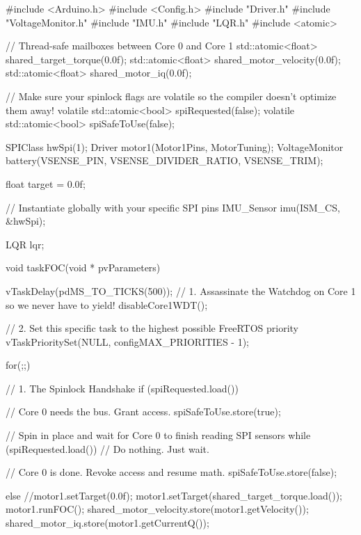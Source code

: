#include <Arduino.h>
#include <Config.h>
#include "Driver.h"
#include "VoltageMonitor.h"
#include "IMU.h"
#include "LQR.h"
#include <atomic>

// Thread-safe mailboxes between Core 0 and Core 1
std::atomic<float> shared_target_torque(0.0f);
std::atomic<float> shared_motor_velocity(0.0f);
std::atomic<float> shared_motor_iq(0.0f);

// Make sure your spinlock flags are volatile so the compiler doesn't optimize them away!
volatile std::atomic<bool> spiRequested(false);
volatile std::atomic<bool> spiSafeToUse(false);

SPIClass hwSpi(1);
Driver motor1(Motor1Pins, MotorTuning); 
VoltageMonitor battery(VSENSE_PIN, VSENSE_DIVIDER_RATIO, VSENSE_TRIM);

float target = 0.0f;

// Instantiate globally with your specific SPI pins
IMU_Sensor imu(ISM_CS, &hwSpi);

LQR lqr;

void taskFOC(void * pvParameters) {
    vTaskDelay(pdMS_TO_TICKS(500));
    // 1. Assassinate the Watchdog on Core 1 so we never have to yield!
    disableCore1WDT(); 

    // 2. Set this specific task to the highest possible FreeRTOS priority
    vTaskPrioritySet(NULL, configMAX_PRIORITIES - 1);

    for(;;) {
        // 1. The Spinlock Handshake
        if (spiRequested.load()) {
            // Core 0 needs the bus. Grant access.
            spiSafeToUse.store(true); 
            
            // Spin in place and wait for Core 0 to finish reading SPI sensors
            while (spiRequested.load()) { 
                // Do nothing. Just wait.
            }
            
            // Core 0 is done. Revoke access and resume math.
            spiSafeToUse.store(false); 
        } else {
            //motor1.setTarget(0.0f);
            motor1.setTarget(shared_target_torque.load());
            motor1.runFOC(); 
            shared_motor_velocity.store(motor1.getVelocity());
            shared_motor_iq.store(motor1.getCurrentQ());
        }
    }
}

